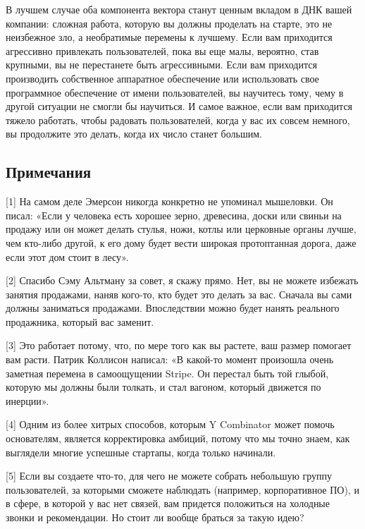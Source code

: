 \documentclass[ebook,12pt,oneside,openany]{memoir}
\begin{document}
В лучшем случае оба компонента вектора станут ценным вкладом в ДНК
вашей компании: сложная работа, которую вы должны проделать на старте,
это не неизбежное зло, а необратимые перемены к лучшему. Если вам
приходится агрессивно привлекать пользователей, пока вы еще малы,
вероятно, став крупными, вы не перестанете быть агрессивными. Если вам
приходится производить собственное аппаратное обеспечение или
использовать свое программное обеспечение от имени пользователей, вы
научитесь тому, чему в другой ситуации не смогли бы научиться. И самое
важное, если вам приходится тяжело работать, чтобы радовать
пользователей, когда у вас их совсем немного, вы продолжите это
делать, когда их число станет большим. \newline

\subsection{Примечания}

[1] На самом деле Эмерсон никогда конкретно не упоминал мышеловки. Он
писал: «Если у человека есть хорошее зерно, древесина, доски или
свиньи на продажу или он может делать стулья, ножи, котлы или
церковные органы лучше, чем кто-либо другой, к его дому будет вести
широкая протоптанная дорога, даже если этот дом стоит в лесу».
\newline

[2] Спасибо Сэму Альтману за совет, я скажу прямо. Нет, вы не можете
избежать занятия продажами, наняв кого-то, кто будет это делать за
вас. Сначала вы сами должны заниматься продажами. Впоследствии можно
будет нанять реального продажника, который вас заменит. \newline

[3] Это работает потому, что, по мере того как вы растете, ваш размер
помогает вам расти. Патрик Коллисон написал: «В какой-то момент
произошла очень заметная перемена в самоощущении Stripe. Он перестал
быть той глыбой, которую мы должны были толкать, и стал вагоном,
который движется по инерции». \newline

[4] Одним из более хитрых способов, которым Y Combinator может помочь
основателям, является корректировка амбиций, потому что мы точно
знаем, как выглядели многие успешные стартапы, когда только начинали.
\newline

[5] Если вы создаете что-то, для чего не можете собрать небольшую
группу пользователей, за которыми сможете наблюдать (например,
корпоративное ПО), и в сфере, в которой у вас нет связей, вам придется
положиться на холодные звонки и рекомендации. Но стоит ли вообще
браться за такую идею? \newline
\end{document}
